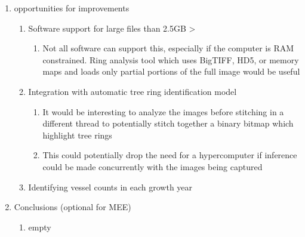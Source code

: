 \documentclass{article}
\begin{document}
\begin{outline}[enumerate]
\begin{enumerate}
\begin{enumerate}
		\end{enumerate}
	\item opportunities for improvements %
		\begin{enumerate}
		\item Software support for large files than 2.5GB >
			\begin{enumerate}
			\item Not all software can support this, especially if the computer is RAM constrained. Ring analysis tool which uses BigTIFF, HD5, or memory maps and loads only partial portions of the full image would be useful
			\end{enumerate}
		\item Integration with automatic tree ring identification model
			\begin{enumerate}
			\item It would be interesting to analyze the images before stitching in a different thread to potentially stitch together a binary bitmap which highlight tree rings
			\item This could potentially drop the need for a hypercomputer if inference could be made concurrently with the images being captured
			\end{enumerate}
		\item Identifying vessel counts in each growth year 
		\end{enumerate}
\item Conclusions (optional for MEE) %
	\begin{enumerate}
	\item empty
	\end{enumerate}

\end{enumerate}
\end{outline}
\end{document}
